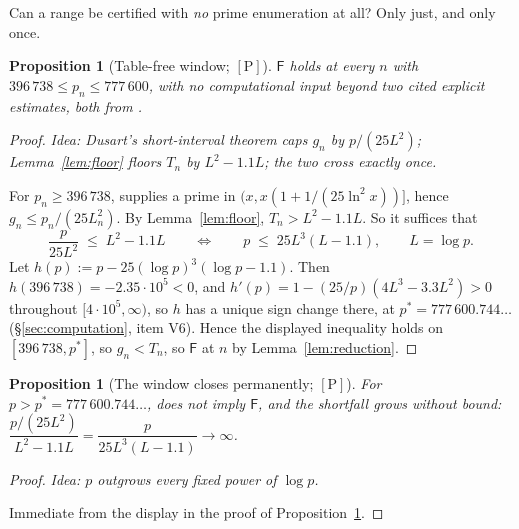 \documentclass[11pt,a4paper]{article}
\theoremstyle{plain}
\newtheorem{proposition}[theorem]{Proposition}
\theoremstyle{definition}
\theoremstyle{remark}
\newcommand{\idea}[1]{\emph{Idea: #1}\par\smallskip}
\newcommand{\cP}{{[\mathrm{P}]}}
\newcommand{\Fb}{\mathsf{F}}
\begin{document}
Can a range be certified with \emph{no} prime enumeration at all? Only just, and only once.

\begin{proposition}[Table-free window; $\cP$]
\label{prop:window}
$\Fb$ holds at every $n$ with $396\,738 \le p_n \le 777\,600$, with no computational input
beyond two cited explicit estimates, both from \cite{dusart2010estimates}.
\end{proposition}

\begin{proof}
\idea{Dusart's short-interval theorem caps $g_n$ by $p/(25L^2)$; Lemma~\ref{lem:floor} floors
$T_n$ by $L^2 - 1.1L$; the two cross exactly once.}
For $p_n \ge 396\,738$, \cite[Prop.~6.8]{dusart2010estimates} supplies a prime in
$(x, x(1 + 1/(25\ln^2 x))]$, hence $g_n \le p_n/(25 L_n^2)$. By Lemma~\ref{lem:floor},
$T_n > L^2 - 1.1L$. So it suffices that
\[
\frac{p}{25L^2} \;\le\; L^2 - 1.1L
\qquad\Longleftrightarrow\qquad
p \;\le\; 25 L^3(L - 1.1), \qquad L = \log p .
\]
Let $h(p) := p - 25(\log p)^3(\log p - 1.1)$. Then $h(396\,738) = -2.35\cdot10^5 < 0$, and
$h'(p) = 1 - (25/p)(4L^3 - 3.3L^2) > 0$ throughout $[4\cdot10^5,\infty)$, so $h$ has a unique
sign change there, at $p^* = 777\,600.744\ldots$ (\S\ref{sec:computation},
item V6). Hence the displayed inequality holds on $[396\,738, p^*]$, so
$g_n < T_n$, so $\Fb$ at $n$ by Lemma~\ref{lem:reduction}.
\end{proof}

\begin{proposition}[The window closes permanently; $\cP$]
\label{prop:closure}
For $p > p^* = 777\,600.744\ldots$, \cite[Prop.~6.8]{dusart2010estimates} does not imply
$\Fb$, and the shortfall grows without bound:
$\dfrac{p/(25L^2)}{L^2 - 1.1L} = \dfrac{p}{25L^3(L-1.1)} \to \infty$.
\end{proposition}

\begin{proof}
\idea{$p$ outgrows every fixed power of $\log p$.}
Immediate from the display in the proof of Proposition~\ref{prop:window}.
\end{proof}
\end{document}
